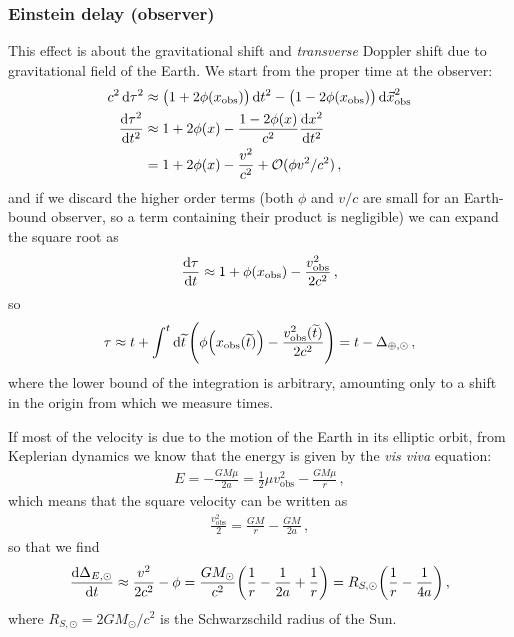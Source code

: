 \documentclass[main.tex]{subfiles}
\begin{document}

\subsubsection{Einstein delay (observer)}

This effect is about the gravitational shift and \emph{transverse} Doppler shift due to gravitational field of the Earth. We start from the proper time at the observer:
%
\begin{align}
c^2 \dd{\tau^2} &\approx \qty(1 + 2 \phi (x _{\text{obs}})) \dd{t^2}
 - \qty(1 - 2 \phi (x _{\text{obs}})) \dd{\vec{x}}^2 _{\text{obs}}  \\
\frac{ \dd{\tau^2}}{ \dd{t^2}} &\approx 1 + 2 \phi (x) - \frac{1 - 2 \phi (x)}{c^2} \frac{ \dd{x^2}}{ \dd{t^2}}  \\
&= 1 + 2 \phi (x) - \frac{v^2}{c^2} + \mathcal{O}(\phi v^2 / c^2)
\,,
\end{align}
%
and if we discard the higher order terms (both \(\phi \) and \(v/c\) are small for an Earth-bound observer, so a term containing their product is negligible) we can expand the square root as
%
\begin{align}
\dv{\tau }{t} \approx 1 + \phi \qty(x _{\text{obs}}) - \frac{v^2 _{\text{obs}}}{2c^2}
\,,
\end{align}
%
so 
%
\begin{align}
\tau \approx t + \int^{t} \dd{\widetilde{t}} \qty(\phi \qty(x _{\text{obs}} (\widetilde{t})) - \frac{v^2 _{\text{obs}} (\widetilde{t})}{2c^2})
= t - \Delta_{\oplus, \odot}
\,,
\end{align}
%
where the lower bound of the integration is arbitrary, amounting only to a shift in the origin from which we measure times. 

If most of the velocity is due to the motion of the Earth in its elliptic orbit, from Keplerian dynamics we know that the energy is given by the \emph{vis viva} equation:
%
\begin{align}
E = - \frac{G M \mu }{2 a} = \frac{1}{2} \mu v _{\text{obs}}^2- \frac{GM \mu }{r}
\,,
\end{align}
%
which means that the square velocity can be written as
%
\begin{align}
\frac{v^2 _{\text{obs}}}{2} = \frac{GM}{r} - \frac{GM}{2a}
\,,
\end{align}
%
so that we find 
%
\begin{align}
\dv{ \Delta_{E, \odot}}{t} \approx \frac{v^2}{2c^2} - \phi = \frac{GM_{\odot}}{c^2} \qty( \frac{1}{r} - \frac{1}{2a} + \frac{1}{r})
= R_{S, \odot} \qty( \frac{1}{r} - \frac{1}{4a})
\,,
\end{align}
%
where \(R_{S, \odot} = 2 GM_{\odot} / c^2\) is the Schwarzschild radius of the Sun. 
\end{document}
